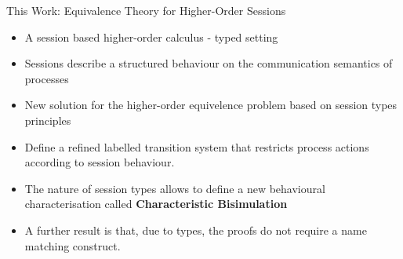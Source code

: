 \documentclass{beamer}
\begin{document}
	\begin{frame}{This Work: Equivalence Theory for Higher-Order Sessions}
		\begin{itemize}
			\item	A session based higher-order calculus - typed setting

			\item	Sessions describe a structured behaviour on the communication semantics of processes

			\item	New solution for the higher-order equivelence problem based
				on session types principles

			\item	Define a refined labelled transition system
				that restricts process actions according to session behaviour.



			\item	The nature of session types allows to define
				a new behavioural characterisation %
				called {\bf Characteristic Bisimulation}


			\item	A further result is that, due to types, the proofs do
				not require a name matching construct.
		\end{itemize}
	\end{frame}
\end{document}
